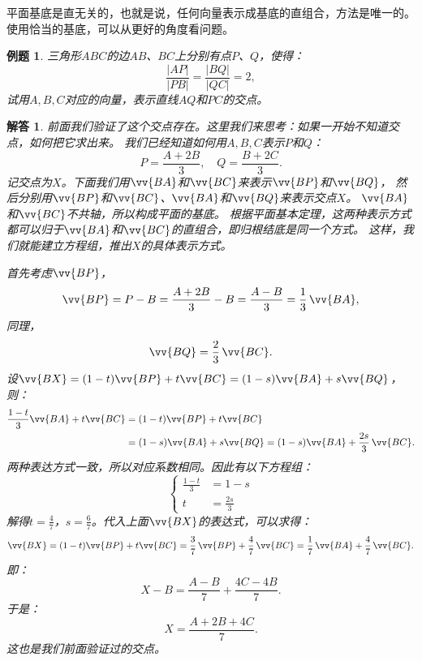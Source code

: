 \documentclass[12pt,UTF8]{ctexbook}
\newtheorem{et}{例题}[section]
\newtheorem*{so}{解答}
\begin{document}
平面基底是直无关的，也就是说，任何向量表示成基底的直组合，方法是唯一的。
使用恰当的基底，可以从更好的角度看问题。

\begin{et}\label{et:0-0-20}
    三角形$ABC$的边$AB$、$BC$上分别有点$P$、$Q$，使得：
    $$ \frac{|AP|}{|PB|} = \frac{|BQ|}{|QC|} = 2,$$
    试用$A,B,C$对应的向量，表示直线$AQ$和$PC$的交点。
\end{et}
\begin{so}
    前面我们验证了这个交点存在。这里我们来思考：如果一开始不知道交点，如何把它求出来。
    我们已经知道如何用$A,B,C$表示$P$和$Q$：
    $$ P = \frac{A + 2B}{3}, \quad Q = \frac{B + 2C}{3}. $$
    记交点为$X$。下面我们用$\vv{BA}$和$\vv{BC}$来表示$\vv{BP}$和$\vv{BQ}$，
    然后分别用$\vv{BP}$和$\vv{BC}$、$\vv{BA}$和$\vv{BQ}$来表示交点$X$。
    $\vv{BA}$和$\vv{BC}$不共轴，所以构成平面的基底。
    根据平面基本定理，这两种表示方式都可以归于$\vv{BA}$和$\vv{BC}$的直组合，即归根结底是同一个方式。
    这样，我们就能建立方程组，推出$X$的具体表示方式。

    首先考虑$\vv{BP}$，
    $$\vv{BP} = P - B = \frac{A + 2B}{3} - B = \frac{A - B}{3} = \frac13 \, \vv{BA},$$
    同理，
    $$\vv{BQ} = \frac23 \, \vv{BC}.$$
    设$\vv{BX} = (1 - t)\vv{BP} + t\vv{BC} = (1 - s)\vv{BA} + s\vv{BQ}$，则：
    \begin{align}
        \frac{1 - t}{3}\vv{BA} + t\vv{BC} &= (1 - t)\vv{BP} + t\vv{BC} \notag \\
        &= (1 - s)\vv{BA} + s\vv{BQ} = (1 - s)\vv{BA} + \frac{2s}{3}\,\vv{BC}. \notag 
    \end{align}
    两种表达方式一致，所以对应系数相同。因此有以下方程组：
    $$
    \left\{
    \begin{array}{ll}
        \frac{1 - t}{3} &= 1 - s \\
        t &= \frac{2s}{3}
    \end{array}
    \right.
    $$
    解得$t = \frac{4}{7}$，$s = \frac{6}{7}$。代入上面$\vv{BX}$的表达式，可以求得：
    $$\vv{BX} = (1 - t)\vv{BP} + t\vv{BC} = \frac{3}{7} \, \vv{BP} + \frac{4}{7} \, \vv{BC} = \frac17 \, \vv{BA} + \frac{4}{7} \, \vv{BC}. $$
    即：
    $$ X - B = \frac{A - B}{7} + \frac{4C - 4B}{7}.$$
    于是：
    $$ X = \frac{A + 2B + 4C}{7}.$$
    这也是我们前面验证过的交点。    
\end{so}
\end{document}
